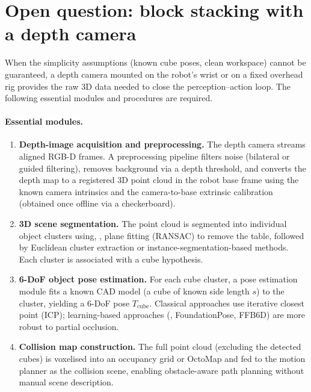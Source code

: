 \documentclass{article}
\begin{document}
\section{Open question: block stacking with a depth camera}
\label{sec:depth}

When the simplicity assumptions (known cube poses, clean workspace) cannot be guaranteed, a depth camera mounted on the robot's wrist or on a fixed overhead rig provides the raw 3D data needed to close the perception--action loop.
The following essential modules and procedures are required.

\paragraph{Essential modules.}

\begin{enumerate}[leftmargin=*,noitemsep,topsep=0pt]
  \item \textbf{Depth-image acquisition and preprocessing.}
        The depth camera streams aligned RGB-D frames.
        A preprocessing pipeline filters noise (bilateral or guided filtering), removes background via a depth threshold, and converts the depth map to a registered 3D point cloud in the robot base frame using the known camera intrinsics and the camera-to-base extrinsic calibration (obtained once offline via a checkerboard).

  \item \textbf{3D scene segmentation.}
        The point cloud is segmented into individual object clusters using, \eg, plane fitting (RANSAC) to remove the table, followed by Euclidean cluster extraction or instance-segmentation-based methods.
        Each cluster is associated with a cube hypothesis.

  \item \textbf{6-DoF object pose estimation.}
        For each cube cluster, a pose estimation module fits a known CAD model (a cube of known side length $s$) to the cluster, yielding a 6-DoF pose $T_\text{cube}$.
        Classical approaches use iterative closest point (ICP); learning-based approaches (\eg, FoundationPose, FFB6D) are more robust to partial occlusion.

  \item \textbf{Collision map construction.}
        The full point cloud (excluding the detected cubes) is voxelised into an occupancy grid or OctoMap and fed to the motion planner as the collision scene, enabling obstacle-aware path planning without manual scene description.


\end{enumerate}
\end{document}
